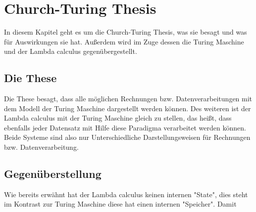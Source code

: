 \section{Church-Turing Thesis}
In diesem Kapitel geht es um die Church-Turing Thesis, was sie besagt und was für Auswirkungen sie hat. Außerdem wird im Zuge dessen die Turing Maschine und der Lambda calculus gegenübergestellt.
\subsection{Die These}
Die These besagt, dass alle möglichen Rechnungen bzw. Datenverarbeitungen mit dem Modell der Turing Maschine dargestellt werden können. Des weiteren ist der Lambda calculus mit der Turing Maschine gleich zu stellen, das heißt, dass ebenfalls jeder Datensatz mit Hilfe diese Paradigma verarbeitet werden können. Beide Systeme sind also nur Unterschiedliche Darstellungsweisen für Rechnungen bzw. Datenverarbeitung.
\cite{sep-church-turing}
\subsection{Gegenüberstellung}
Wie bereits erwähnt hat der Lambda calculus keinen internen "State", dies steht im Kontrast zur Turing Maschine diese hat einen internen "Speicher". Damit  
